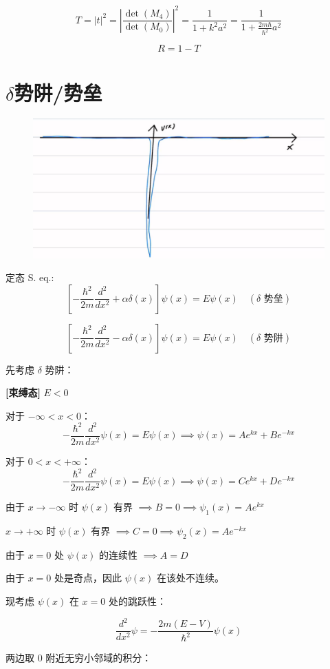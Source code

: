 \documentclass[lang=cn,10pt]{elegantbook}
\begin{document}
\begin{enumerate}
	\[
	T = |t|^2 = \left| \frac{\det(M_4)}{\det(M_0)} \right|^2 = \frac{1}{1 + k^2a^2} = \frac{1}{1 + \frac{2m\hbar}{\hbar^2}a^2}
	\]
	
	\[
	R = 1 - T
	\]
\end{enumerate}
\section{$\delta$势阱/势垒}
\begin{figure}[H]
	\centering
	\includegraphics[width=0.7\linewidth]{figure/screenshot0028}
\end{figure}
定态 S. eq.:
\[
\left[ -\frac{\hbar^2}{2m} \frac{d^2}{dx^2} + \alpha \delta(x) \right] \psi(x) = E \psi(x) \quad (\delta \text{ 势垒})
\]


\[
\left[ -\frac{\hbar^2}{2m} \frac{d^2}{dx^2} - \alpha \delta(x) \right] \psi(x) = E \psi(x) \quad (\delta \text{ 势阱})
\]

先考虑 $\delta$ 势阱：

\textbf{[束缚态]} $E < 0$

对于 $-\infty < x < 0$：
\[
-\frac{\hbar^2}{2m} \frac{d^2}{dx^2} \psi(x) = E \psi(x) \implies \psi(x) = A e^{kx} + B e^{-kx}
\]

对于 $0 < x < +\infty$：
\[
-\frac{\hbar^2}{2m} \frac{d^2}{dx^2} \psi(x) = E \psi(x) \implies \psi(x) = C e^{kx} + D e^{-kx}
\]

由于 $x \rightarrow -\infty$ 时 $\psi(x)$ 有界 $\implies B = 0 \implies \psi_1(x) = A e^{kx}$

$x \rightarrow +\infty$ 时 $\psi(x)$ 有界 $\implies C = 0 \implies \psi_2(x) = A e^{-kx}$

由于 $x=0$ 处 $\psi(x)$ 的连续性 $\implies A = D$

由于 $x=0$ 处是奇点，因此 $\psi(x)$ 在该处不连续。

现考虑 $\psi(x)$ 在 $x=0$ 处的跳跃性：

\[
\frac{d^2}{dx^2} \psi = -\frac{2m(E-V)}{\hbar^2} \psi(x)
\]

两边取 $0$ 附近无穷小邻域的积分：
\end{document}
